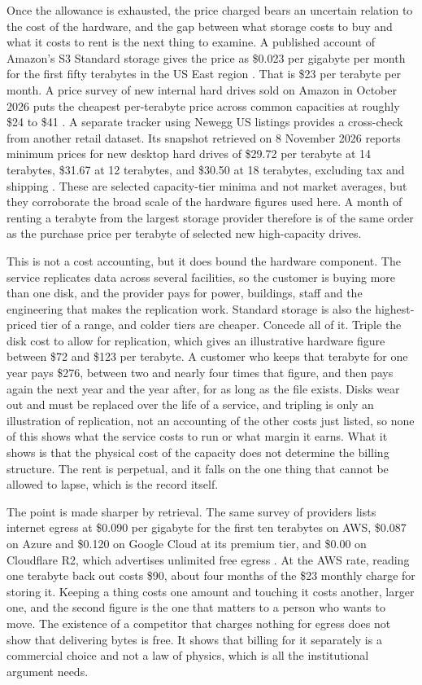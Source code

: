 \documentclass[12pt]{article}
\begin{document}
Once the allowance is exhausted, the price charged bears an uncertain relation to the cost of the hardware, and the gap between what storage costs to buy and what it costs to rent is the next thing to examine. A published account of Amazon's S3 Standard storage gives the price as \$0.023 per gigabyte per month for the first fifty terabytes in the US East region \cite{filebase}. That is \$23 per terabyte per month. A price survey of new internal hard drives sold on Amazon in October 2026 puts the cheapest per-terabyte price across common capacities at roughly \$24 to \$41 \cite{hddhunt}. A separate tracker using Newegg US listings provides a cross-check from another retail dataset. Its snapshot retrieved on 8 November 2026 reports minimum prices for new desktop hard drives of \$29.72 per terabyte at 14 terabytes, \$31.67 at 12 terabytes, and \$30.50 at 18 terabytes, excluding tax and shipping \cite{componentprices}. These are selected capacity-tier minima and not market averages, but they corroborate the broad scale of the hardware figures used here. A month of renting a terabyte from the largest storage provider therefore is of the same order as the purchase price per terabyte of selected new high-capacity drives.

This is not a cost accounting, but it does bound the hardware component. The service replicates data across several facilities, so the customer is buying more than one disk, and the provider pays for power, buildings, staff and the engineering that makes the replication work. Standard storage is also the highest-priced tier of a range, and colder tiers are cheaper. Concede all of it. Triple the disk cost to allow for replication, which gives an illustrative hardware figure between \$72 and \$123 per terabyte. A customer who keeps that terabyte for one year pays \$276, between two and nearly four times that figure, and then pays again the next year and the year after, for as long as the file exists. Disks wear out and must be replaced over the life of a service, and tripling is only an illustration of replication, not an accounting of the other costs just listed, so none of this shows what the service costs to run or what margin it earns. What it shows is that the physical cost of the capacity does not determine the billing structure. The rent is perpetual, and it falls on the one thing that cannot be allowed to lapse, which is the record itself.

The point is made sharper by retrieval. The same survey of providers lists internet egress at \$0.090 per gigabyte for the first ten terabytes on AWS, \$0.087 on Azure and \$0.120 on Google Cloud at its premium tier, and \$0.00 on Cloudflare R2, which advertises unlimited free egress \cite{ecorpit}. At the AWS rate, reading one terabyte back out costs \$90, about four months of the \$23 monthly charge for storing it. Keeping a thing costs one amount and touching it costs another, larger one, and the second figure is the one that matters to a person who wants to move. The existence of a competitor that charges nothing for egress does not show that delivering bytes is free. It shows that billing for it separately is a commercial choice and not a law of physics, which is all the institutional argument needs.
\end{document}

